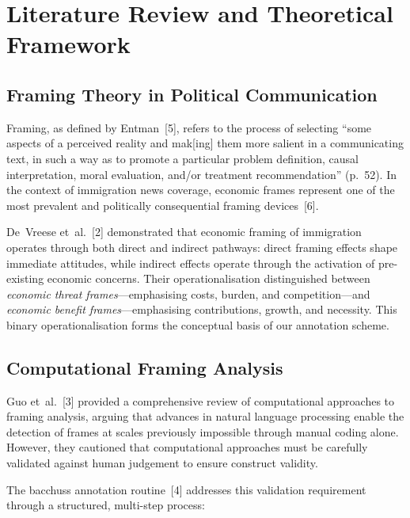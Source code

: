 \section{Literature Review and Theoretical Framework}
\label{sec:literature}

\subsection{Framing Theory in Political Communication}

Framing, as defined by Entman~[5], refers to the process of selecting ``some aspects of a perceived reality and mak[ing] them more salient in a communicating text, in such a way as to promote a particular problem definition, causal interpretation, moral evaluation, and/or treatment recommendation'' (p.~52). In the context of immigration news coverage, economic frames represent one of the most prevalent and politically consequential framing devices~[6].

De~Vreese et~al.~[2] demonstrated that economic framing of immigration operates through both direct and indirect pathways: direct framing effects shape immediate attitudes, while indirect effects operate through the activation of pre-existing economic concerns. Their operationalisation distinguished between \textit{economic threat frames}---emphasising costs, burden, and competition---and \textit{economic benefit frames}---emphasising contributions, growth, and necessity. This binary operationalisation forms the conceptual basis of our annotation scheme.

\subsection{Computational Framing Analysis}

Guo et~al.~[3] provided a comprehensive review of computational approaches to framing analysis, arguing that advances in natural language processing enable the detection of frames at scales previously impossible through manual coding alone. However, they cautioned that computational approaches must be carefully validated against human judgement to ensure construct validity.

The bacchuss annotation routine~[4] addresses this validation requirement through a structured, multi-step process:

